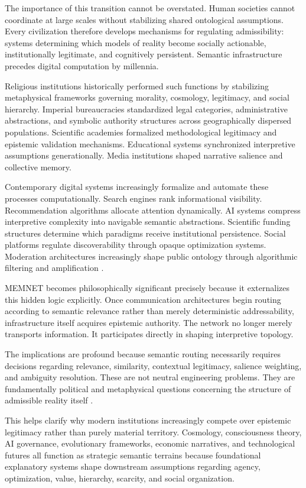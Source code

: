 \documentclass[11pt,a4paper]{article}
\begin{document}
The importance of this transition cannot be overstated. Human societies cannot coordinate at large scales without stabilizing shared ontological assumptions. Every civilization therefore develops mechanisms for regulating admissibility: systems determining which models of reality become socially actionable, institutionally legitimate, and cognitively persistent. Semantic infrastructure precedes digital computation by millennia.

Religious institutions historically performed such functions by stabilizing metaphysical frameworks governing morality, cosmology, legitimacy, and social hierarchy. Imperial bureaucracies standardized legal categories, administrative abstractions, and symbolic authority structures across geographically dispersed populations. Scientific academies formalized methodological legitimacy and epistemic validation mechanisms. Educational systems synchronized interpretive assumptions generationally. Media institutions shaped narrative salience and collective memory.

Contemporary digital systems increasingly formalize and automate these processes computationally. Search engines rank informational visibility. Recommendation algorithms allocate attention dynamically. AI systems compress interpretive complexity into navigable semantic abstractions. Scientific funding structures determine which paradigms receive institutional persistence. Social platforms regulate discoverability through opaque optimization systems. Moderation architectures increasingly shape public ontology through algorithmic filtering and amplification \cite{gillespie2018}.

MEMNET becomes philosophically significant precisely because it externalizes this hidden logic explicitly. Once communication architectures begin routing according to semantic relevance rather than merely deterministic addressability, infrastructure itself acquires epistemic authority. The network no longer merely transports information. It participates directly in shaping interpretive topology.

The implications are profound because semantic routing necessarily requires decisions regarding relevance, similarity, contextual legitimacy, salience weighting, and ambiguity resolution. These are not neutral engineering problems. They are fundamentally political and metaphysical questions concerning the structure of admissible reality itself \cite{winner1980}.

This helps clarify why modern institutions increasingly compete over epistemic legitimacy rather than purely material territory. Cosmology, consciousness theory, AI governance, evolutionary frameworks, economic narratives, and technological futures all function as strategic semantic terrains because foundational explanatory systems shape downstream assumptions regarding agency, optimization, value, hierarchy, scarcity, and social organization.
\end{document}
